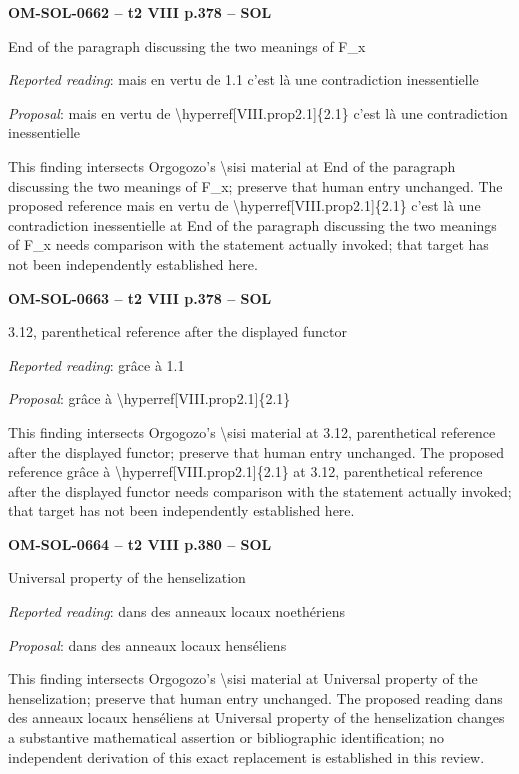 \par\noindent\textbf{OM-SOL-0662 -- t2 VIII p.378 -- SOL}\par
End of the paragraph discussing the two meanings of F\_x\par
\emph{Reported reading}: mais en vertu de 1.1 c'est là une contradiction inessentielle\par
\emph{Proposal}: mais en vertu de \textbackslash{}hyperref[VIII.prop2.1]\{2.1\} c'est là une contradiction inessentielle\par
This finding intersects Orgogozo's \textbackslash{}sisi material at End of the paragraph discussing the two meanings of F\_x; preserve that human entry unchanged. The proposed reference mais en vertu de \textbackslash{}hyperref[VIII.prop2.1]\{2.1\} c'est là une contradiction inessentielle at End of the paragraph discussing the two meanings of F\_x needs comparison with the statement actually invoked; that target has not been independently established here.\par
\par\noindent\textbf{OM-SOL-0663 -- t2 VIII p.378 -- SOL}\par
3.12, parenthetical reference after the displayed functor\par
\emph{Reported reading}: grâce à 1.1\par
\emph{Proposal}: grâce à \textbackslash{}hyperref[VIII.prop2.1]\{2.1\}\par
This finding intersects Orgogozo's \textbackslash{}sisi material at 3.12, parenthetical reference after the displayed functor; preserve that human entry unchanged. The proposed reference grâce à \textbackslash{}hyperref[VIII.prop2.1]\{2.1\} at 3.12, parenthetical reference after the displayed functor needs comparison with the statement actually invoked; that target has not been independently established here.\par
\par\noindent\textbf{OM-SOL-0664 -- t2 VIII p.380 -- SOL}\par
Universal property of the henselization\par
\emph{Reported reading}: dans des anneaux locaux noethériens\par
\emph{Proposal}: dans des anneaux locaux henséliens\par
This finding intersects Orgogozo's \textbackslash{}sisi material at Universal property of the henselization; preserve that human entry unchanged. The proposed reading dans des anneaux locaux henséliens at Universal property of the henselization changes a substantive mathematical assertion or bibliographic identification; no independent derivation of this exact replacement is established in this review.\par

